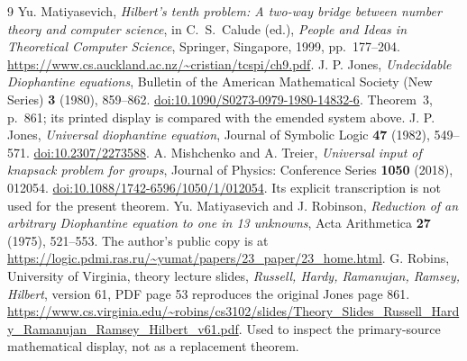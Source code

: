 \documentclass[11pt]{article}
\begin{document}
\begin{thebibliography}{9}
 Yu. Matiyasevich,
\emph{Hilbert's tenth problem: A two-way bridge between number theory and computer science},
in C.~S.~Calude (ed.), \emph{People and Ideas in Theoretical Computer Science},
Springer, Singapore, 1999, pp.~177--204.
\url{https://www.cs.auckland.ac.nz/~cristian/tcspi/ch9.pdf}.
 J. P. Jones,
\emph{Undecidable Diophantine equations},
Bulletin of the American Mathematical Society (New Series)
\textbf{3} (1980), 859--862.
\href{https://doi.org/10.1090/S0273-0979-1980-14832-6}{doi:10.1090/S0273-0979-1980-14832-6}.
Theorem~3, p.~861; its printed display is compared with the emended system above.
 J. P. Jones,
\emph{Universal diophantine equation}, Journal of Symbolic Logic
\textbf{47} (1982), 549--571.
\href{https://doi.org/10.2307/2273588}{doi:10.2307/2273588}.
 A. Mishchenko and A. Treier,
\emph{Universal input of knapsack problem for groups},
Journal of Physics: Conference Series \textbf{1050} (2018), 012054.
\href{https://doi.org/10.1088/1742-6596/1050/1/012054}{doi:10.1088/1742-6596/1050/1/012054}.
Its explicit transcription is not used for the present theorem.
 Yu. Matiyasevich and J. Robinson,
\emph{Reduction of an arbitrary Diophantine equation to one in 13
unknowns}, Acta Arithmetica \textbf{27} (1975), 521--553.
The author's public copy is at
\url{https://logic.pdmi.ras.ru/~yumat/papers/23_paper/23_home.html}.
 G. Robins, University of Virginia, theory lecture slides,
\emph{Russell, Hardy, Ramanujan, Ramsey, Hilbert}, version 61,
PDF page 53 reproduces the original Jones page 861.
\url{https://www.cs.virginia.edu/~robins/cs3102/slides/Theory_Slides_Russell_Hardy_Ramanujan_Ramsey_Hilbert_v61.pdf}.
Used to inspect the primary-source mathematical display, not as a
replacement theorem.
\end{thebibliography}
\end{document}
